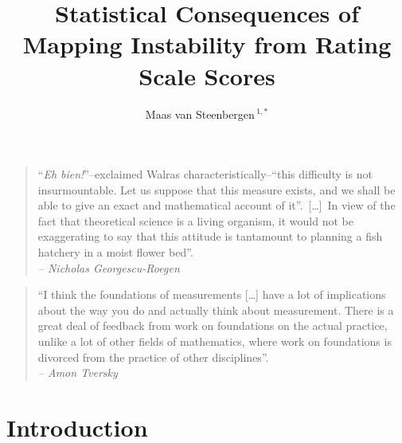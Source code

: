 \documentclass[utf8]{FrontiersinVancouver}
\def\firstAuthorLast{van Steenbergen} %
\def\Authors{Maas van Steenbergen\,$^{1,*}$}
\begin{document}
\onecolumn
{}

\title[]{Statistical Consequences of Mapping Instability from Rating Scale Scores} 

\author[\firstAuthorLast]{\Authors} %
\address{} %
\correspondance{} %

\extraAuth{}%

\maketitle


\begin{quote}
    ``\textit{Eh bien!}''--exclaimed Walras characteristically--``this difficulty is not insurmountable. Let us suppose that this measure exists, and we shall be able to give an exact and mathematical account of it''.\ 
    [\dots]\ In view of the fact that theoretical science is a living organism, it would not be exaggerating to say that this attitude is tantamount to planning a fish hatchery in a moist flower bed''.\\
    \textit{-- Nicholas Georgescu-Roegen}

\end{quote}
\begin{quote}
    ``I think the foundations of measurements [\ldots] have a lot of implications about the way you do and actually think about measurement. There is a great deal of feedback from work on foundations on the actual practice, unlike a lot of other fields of mathematics, where work on foundations is divorced from the practice of other disciplines''.\\
    \textit{-- Amon Tversky}
\end{quote}

\section{Introduction}
\end{document}
